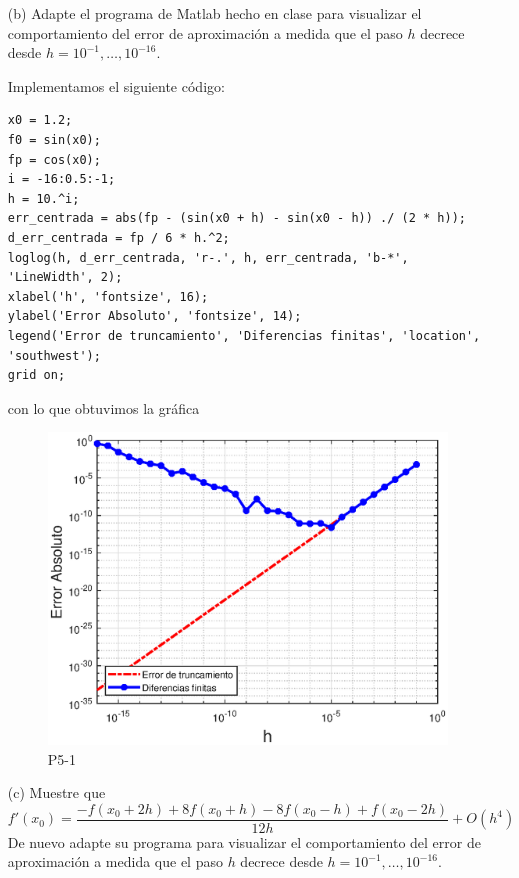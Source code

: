 \documentclass[12pt, a4paper]{article}%
\begin{document}
\begin{itemize}
    \item[(b)] Adapte el programa de Matlab hecho en clase para visualizar el comportamiento del error de aproximación a medida que el paso \( h \) decrece desde \( h = 10^{-1}, \dots, 10^{-16} \).

\begin{solution}
        Implementamos el siguiente código:\\

        \newpage

\begin{lstlisting}
x0 = 1.2;       
f0 = sin(x0);       
fp = cos(x0);     
i = -16:0.5:-1;
h = 10.^i;
err_centrada = abs(fp - (sin(x0 + h) - sin(x0 - h)) ./ (2 * h));
d_err_centrada = fp / 6 * h.^2;
loglog(h, d_err_centrada, 'r-.', h, err_centrada, 'b-*', 'LineWidth', 2);
xlabel('h', 'fontsize', 16);
ylabel('Error Absoluto', 'fontsize', 14);
legend('Error de truncamiento', 'Diferencias finitas', 'location', 'southwest');
grid on;
\end{lstlisting}


con lo que obtuvimos la gráfica

\begin{figure}[H]
    \centering
    \includegraphics[width=0.75\linewidth]{Gráficas/P5-1.eps}
    \caption{P5-1}
    \label{fig:bluelabel}
\end{figure}
    
\end{solution}

    \item[(c)] Muestre que
    \[
    f'(x_0) = \dfrac{-f(x_0 + 2h) + 8f(x_0 + h) - 8f(x_0 - h) + f(x_0 - 2h)}{12h} + O(h^4)
    \]
    De nuevo adapte su programa para visualizar el comportamiento del error de aproximación a medida que el paso \( h \) decrece desde \( h = 10^{-1}, \dots, 10^{-16} \).
\end{itemize}
\end{document}
